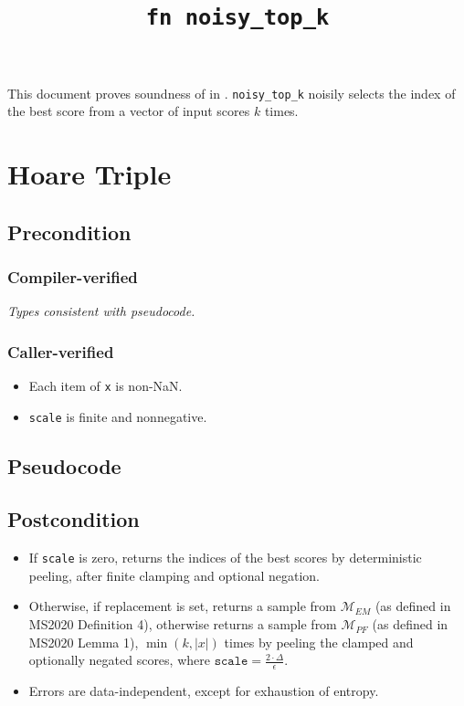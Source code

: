 \documentclass{article}
\title{\texttt{fn noisy\_top\_k}}
\author{\MichaelShoemateAuthor}
\begin{document}
\maketitle
\contrib
This document proves soundness of  in .
\texttt{noisy\_top\_k} noisily selects the index of the best score from a vector of input scores $k$ times.

\section{Hoare Triple}
\subsection*{Precondition}
\subsubsection*{Compiler-verified}
\textit{Types consistent with pseudocode.}

\subsubsection*{Caller-verified}
\begin{itemize}
    \item Each item of \texttt{x} is non-NaN.
    \item \texttt{scale} is finite and nonnegative.
\end{itemize}

\subsection*{Pseudocode}
\label{sec:python-pseudocode}


\subsection*{Postcondition}
\begin{theorem}
    \label{postcondition}

    \begin{itemize}
        \item If \texttt{scale} is zero, returns the indices of the best scores by deterministic peeling, after finite clamping and optional negation.
        \item Otherwise, if replacement is set, returns a sample from $\mathcal{M}_{EM}$ (as defined in MS2020 Definition 4),
            otherwise returns a sample from $\mathcal{M}_{PF}$ (as defined in MS2020 Lemma 1),
            $\min(k, |x|)$ times by peeling the clamped and optionally negated scores,
            where $\texttt{scale} = \frac{2 \cdot \Delta}{\epsilon}$.
        \item Errors are data-independent, except for exhaustion of entropy.
    \end{itemize}
\end{theorem}
\end{document}
